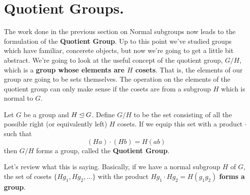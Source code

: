     \section{Quotient Groups.}
    The work done in the previous section on Normal subgroups now
    leads to the formulation of the \textbf{Quotient Group}. Up to
    this point we've studied groups which have familiar, concerete
    objects, but now we're going to get a little bit abstract.
    We're going to look at the useful concept of the quotient group, $G/H$,
    which is a 
    \textbf{group whose elements are $H$ cosets}. That is, the elements of
    our group are going to be sets themselves. The operation on the
    elements of the quotient group can only make sense if the cosets
    are from a subgroup $H$ which is normal to $G$.

    \begin{thm}
        Let $G$ be a group and $H \unlhd G$. Define $G/H$ to be the
        set consisting of all the possible right (or equivalently
        left) $H$ cosets. If we
        equip this set with a product $\cdot$ such that 
        \[
            (Ha)\cdot(Hb) = H(ab)
        \]
        then $G/H$ forms a group, called the \textbf{Quotient Group}.
    \end{thm}
    Let's review what this is saying. Basically, if we have a normal
    subgroup $H$ of $G$, the set of cosets $\{Hg_1, Hg_2, \dots \}$
    with the product $Hg_1 \cdot Hg_2 = H(g_1g_2)$ \textbf{forms a group}.

